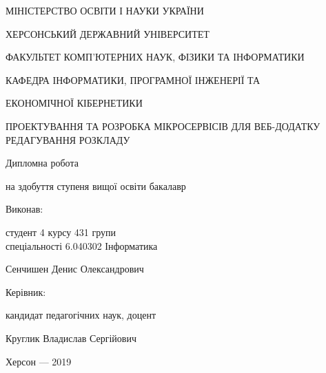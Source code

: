 \thispagestyle{empty}

{\centering
МІНІСТЕРСТВО ОСВІТИ І НАУКИ УКРАЇНИ

ХЕРСОНСЬКИЙ ДЕРЖАВНИЙ УНІВЕРСИТЕТ

ФАКУЛЬТЕТ КОМП'ЮТЕРНИХ НАУК, ФІЗИКИ ТА ІНФОРМАТИКИ

КАФЕДРА ІНФОРМАТИКИ, ПРОГРАМНОЇ ІНЖЕНЕРІЇ ТА 

ЕКОНОМІЧНОЇ КІБЕРНЕТИКИ

\vfill

ПРОЕКТУВАННЯ ТА РОЗРОБКА МІКРОСЕРВІСІВ ДЛЯ ВЕБ-ДОДАТКУ РЕДАГУВАННЯ РОЗКЛАДУ

Дипломна робота

на здобуття ступеня вищої освіти бакалавр

}

\vfill

\hfill\begin{minipage}[t]{0.6\textwidth}
Виконав: 

студент 4 курсу 431 групи \\ спеціальності 6.040302  Інформатика

Сенчишен Денис Олександрович

Керівник:

кандидат педагогічних наук, доцент

Круглик Владислав Сергійович

\end{minipage}

\vfill

{\centering
Херсон --- 2019

}
